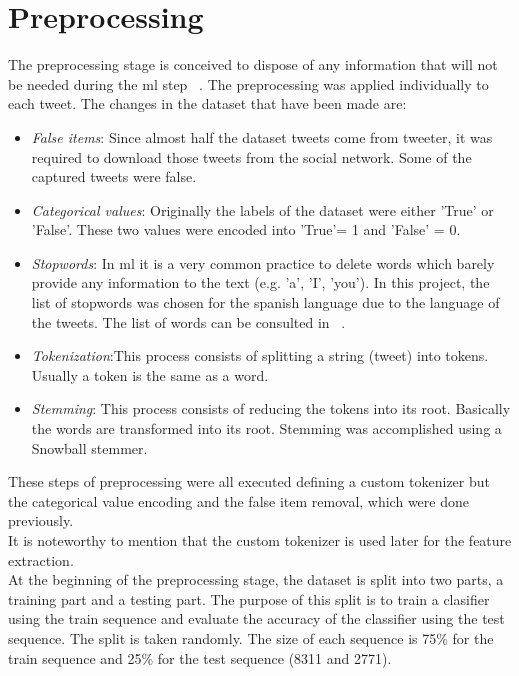 \section{Preprocessing}
\label{sec:preprocessing}
The preprocessing stage is conceived to dispose of any information that will not be needed during the \ac{ml} step ~\cite{preprocess}. The preprocessing was applied individually to each tweet.
The changes in the dataset that have been made are:
\begin{itemize}
	\item \textit{False items}: Since almost half the dataset tweets come from tweeter, it was required to download those tweets from the social network. Some of the captured tweets were false.
	\item \textit{Categorical values}: Originally the labels of the dataset were either 'True' or 'False'. These two values were encoded into 'True'= 1 and 'False' = 0.
	\item \textit{Stopwords}:  In \ac{ml} it is a very common practice to delete words which barely provide any information to the text (e.g. 'a', 'I', 'you'). In this project, the list of stopwords was chosen for the spanish language due to the language of the tweets. The list of words can be consulted in ~\cite{stopwords}.
	\item \textit{Tokenization}:This process consists of splitting a string (tweet) into tokens. Usually a token is the same as a word.
	\item 
	\textit{Stemming}: This process consists of reducing the tokens into its root. Basically the words are transformed into its root. Stemming was accomplished using a Snowball stemmer. 
\end{itemize}
These steps of preprocessing were all executed defining a custom tokenizer but the categorical value encoding and the false item removal, which were done previously.\\
It is noteworthy to mention that the custom tokenizer is used later for the feature extraction.\\
At the beginning of the preprocessing stage, the dataset is split into two parts, a training part and a testing part. The purpose of this split is to train a clasifier using the train  sequence and evaluate the accuracy of the classifier using the test sequence. The split is taken randomly. The size of each sequence is 75\% for the train sequence and 25\% for the test sequence (8311 and 2771).
